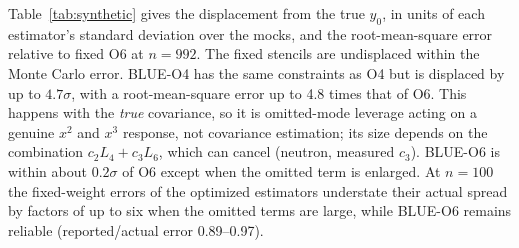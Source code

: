 \documentclass[aps,prd,preprint,nofootinbib,floatfix]{revtex4-2}
\begin{document}
Table~\ref{tab:synthetic} gives the displacement from the true $y_0$, in units of each estimator's standard deviation over the mocks, and the root-mean-square error relative to fixed O6 at $n=992$. The fixed stencils are undisplaced within the Monte Carlo error. BLUE-O4 has the same constraints as O4 but is displaced by up to $4.7\sigma$, with a root-mean-square error up to 4.8 times that of O6. This happens with the \emph{true} covariance, so it is omitted-mode leverage acting on a genuine $x^2$ and $x^3$ response, not covariance estimation; its size depends on the combination $c_2L_4+c_3L_6$, which can cancel (neutron, measured $c_3$). BLUE-O6 is within about $0.2\sigma$ of O6 except when the omitted term is enlarged. At $n=100$ the fixed-weight errors of the optimized estimators understate their actual spread by factors of up to six when the omitted terms are large, while BLUE-O6 remains reliable (reported/actual error 0.89--0.97).

\begin{table}[t]
\caption{Synthetic ensembles ($n=992$) with known covariance and response. For each truth, the first column is the mean displacement from the true $y_0$ in units of the estimator's standard deviation over the mocks (Monte Carlo error about 0.03), the second the root-mean-square error relative to fixed O6. ``Data'' uses the measured cubic coefficient; ``$3\times$'' triples it.}
\label{tab:synthetic}
\centering
\setlength{\tabcolsep}{3pt}
\end{table}
\end{document}
